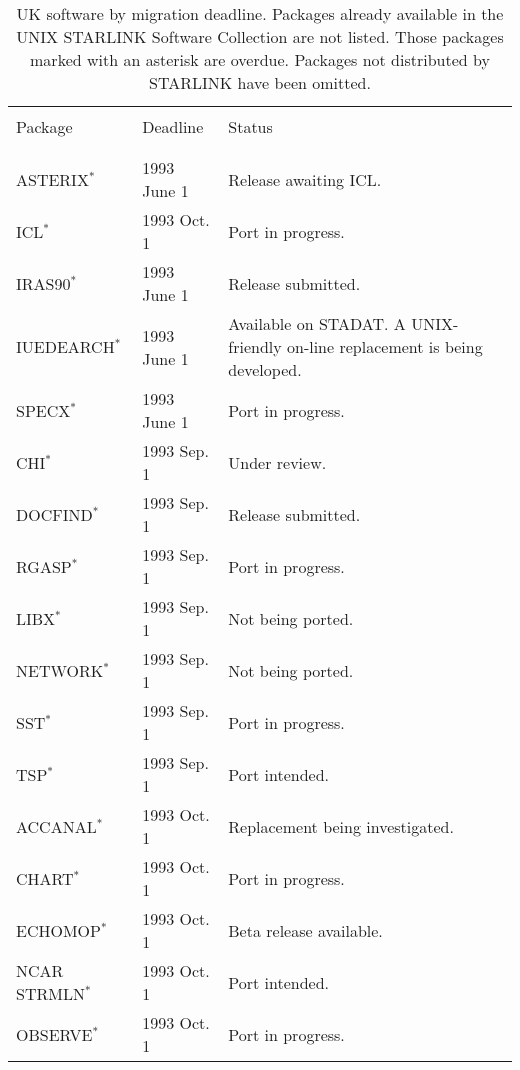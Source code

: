 \begin{table}
\begin{center}
\caption{UK software by migration deadline.
Packages already available in the UNIX STARLINK Software Collection
are not listed.
Those packages marked with an asterisk are overdue.
Packages not distributed by STARLINK have been omitted.}
\vspace{5mm}
\begin{tabular}{|p{36mm}|p{30mm}|p{60mm}|} \hline \label{t_UKdead}
& & \\
Package & Deadline & Status \\
& & \\ \hline
& & \\
ASTERIX$^{\ast}$                & 1993 June 1  & Release awaiting ICL. \\
ICL$^{\ast}$                    & 1993 Oct. 1  & Port in progress. \\
IRAS90$^{\ast}$                 & 1993 June 1  & Release submitted. \\
IUEDEARCH$^{\ast}$              & 1993 June 1  & Available on STADAT. A
   UNIX-friendly on-line replacement is being developed.\\
SPECX$^{\ast}$                  & 1993 June 1  & Port in progress. \\
CHI$^{\ast}$                    & 1993 Sep. 1  & Under review. \\
DOCFIND$^{\ast}$                & 1993 Sep. 1  & Release submitted. \\
RGASP$^{\ast}$                  & 1993 Sep. 1  & Port in progress. \\
LIBX$^{\ast}$                   & 1993 Sep. 1  & Not being ported. \\
NETWORK$^{\ast}$                & 1993 Sep. 1  & Not being ported. \\
SST$^{\ast}$                    & 1993 Sep. 1  & Port in progress. \\
TSP$^{\ast}$                    & 1993 Sep. 1  & Port intended. \\
ACCANAL$^{\ast}$                & 1993 Oct. 1  & Replacement being 
   investigated. \\
CHART$^{\ast}$                  & 1993 Oct. 1  & Port in progress. \\
ECHOMOP$^{\ast}$                & 1993 Oct. 1  & Beta release available. \\
NCAR STRMLN$^{\ast}$            & 1993 Oct. 1  & Port intended. \\
OBSERVE$^{\ast}$                & 1993 Oct. 1  & Port in progress. \\

\end{tabular}
\end{center}
\end{table}
